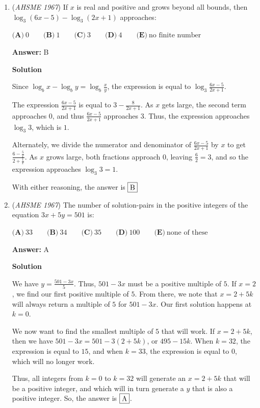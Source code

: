 \begin{enumerate}
	\item (\textit{AHSME 1967}) If $x$ is real and positive and grows beyond all bounds, then $\log_3{(6x-5)}-\log_3{(2x+1)}$ approaches:


 $\textbf{(A)}\ 0\qquad \textbf{(B)}\ 1\qquad \textbf{(C)}\ 3\qquad \textbf{(D)}\ 4\qquad \textbf{(E)}\ \text{no finite number}$

 \textbf{Answer: }B



\textbf{Solution}

Since $\log_b x - \log_b y = \log_b \frac{x}{y}$, the expression is equal to $\log_3 \frac{6x - 5}{2x + 1}$.

 The expression $\frac{6x - 5}{2x + 1}$ is equal to $3 - \frac{8}{2x + 1}$.  As $x$ gets large, the second term approaches $0$, and thus $\frac{6x - 5}{2x + 1}$ approaches $3$.  Thus, the expression approaches $\log_3 3$, which is $1$.

 Alternately, we divide the numerator and denominator of $\frac{6x - 5}{2x + 1}$ by $x$ to get $\frac{6 - \frac{5}{x}}{2 + \frac{1}{x}}$.  As $x$ grows large, both fractions approach $0$, leaving $\frac{6}{2} = 3$, and so the expression approaches $\log_3 3 = 1$.

 With either reasoning, the answer is $\fbox{B}$



	\item (\textit{AHSME 1967}) The number of solution-pairs in the positive integers of the equation $3x+5y=501$ is:


 $\textbf{(A)}\ 33\qquad \textbf{(B)}\ 34\qquad \textbf{(C)}\ 35\qquad \textbf{(D)}\ 100\qquad \textbf{(E)}\ \text{none of these}$

 \textbf{Answer: }A



\textbf{Solution}

We have $y = \frac{501 - 3x}{5}$.  Thus, $501 - 3x$ must be a positive multiple of $5$.  If $x = 2$, we find our first positive multiple of $5$.  From there, we note that $x = 2 + 5k$ will always return a multiple of $5$ for $501 - 3x$.  Our first solution happens at $k=0$.  

 
We now want to find the smallest multiple of $5$ that will work.  If $x = 2 + 5k$, then we have $501 - 3x = 501 - 3(2 + 5k)$, or $495 - 15k$.  When $k = 32$, the expression is equal to $15$, and when $k = 33$, the expression is equal to $0$, which will no longer work.

 
Thus, all integers from $k = 0$ to $k = 32$ will generate an $x = 2 + 5k$ that will be a positive integer, and which will in turn generate a $y$ that is also a positive integer.  So, the answer is $\fbox{A}$.


\end{enumerate}
